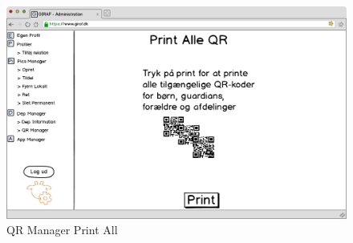 \begin{figure}[p]
\centering
\includegraphics[width=1\textwidth]{images/mockup/qrManagerPrintAll.png}
\caption{QR Manager Print All}
\label{fig:qr_manager_print_all}
\end{figure}